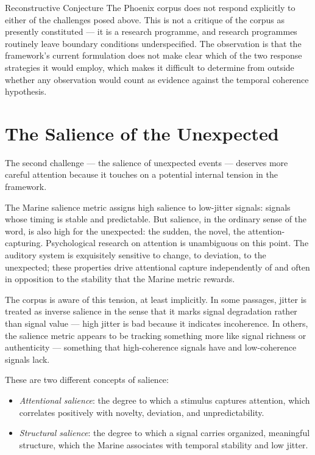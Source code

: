 \begin{epistemicstatus}{Reconstructive Conjecture}
The Phoenix corpus does not respond explicitly to either
of the challenges posed above. This is not a critique of
the corpus as presently constituted --- it is a research
programme, and research programmes routinely leave boundary
conditions underspecified. The observation is that the
framework's current formulation does not make clear which
of the two response strategies it would employ, which makes
it difficult to determine from outside whether any
observation would count as evidence against the temporal
coherence hypothesis.
\end{epistemicstatus}

\section{The Salience of the Unexpected}
\label{sec:salience-unexpected}

The second challenge --- the salience of unexpected events
--- deserves more careful attention because it touches on
a potential internal tension in the framework.

The Marine salience metric assigns high salience to low-jitter
signals: signals whose timing is stable and predictable.
But salience, in the ordinary sense of the word, is also
high for the unexpected: the sudden, the novel, the
attention-capturing. Psychological research on attention
is unambiguous on this point. The auditory system is
exquisitely sensitive to change, to deviation, to the
unexpected; these properties drive attentional capture
independently of and often in opposition to the stability
that the Marine metric rewards.

The corpus is aware of this tension, at least implicitly.
In some passages, jitter is treated as inverse salience
in the sense that it marks signal degradation rather than
signal value --- high jitter is bad because it indicates
incoherence. In others, the salience metric appears to
be tracking something more like signal richness or
authenticity --- something that high-coherence signals
have and low-coherence signals lack.

These are two different concepts of salience:

\begin{itemize}
  \item \textit{Attentional salience}: the degree to which
  a stimulus captures attention, which correlates positively
  with novelty, deviation, and unpredictability.
  \item \textit{Structural salience}: the degree to which
  a signal carries organized, meaningful structure, which
  the Marine associates with temporal stability and low jitter.
\end{itemize}

